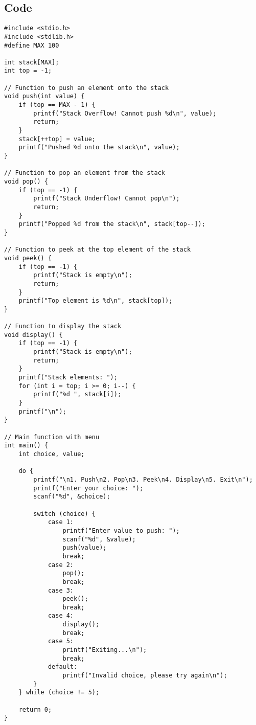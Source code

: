 \documentclass[12pt,a4paper]{article}
\begin{document}
\subsection*{Code}
\begin{lstlisting}
#include <stdio.h>
#include <stdlib.h>
#define MAX 100

int stack[MAX];
int top = -1;

// Function to push an element onto the stack
void push(int value) {
    if (top == MAX - 1) {
        printf("Stack Overflow! Cannot push %d\n", value);
        return;
    }
    stack[++top] = value;
    printf("Pushed %d onto the stack\n", value);
}

// Function to pop an element from the stack
void pop() {
    if (top == -1) {
        printf("Stack Underflow! Cannot pop\n");
        return;
    }
    printf("Popped %d from the stack\n", stack[top--]);
}

// Function to peek at the top element of the stack
void peek() {
    if (top == -1) {
        printf("Stack is empty\n");
        return;
    }
    printf("Top element is %d\n", stack[top]);
}

// Function to display the stack
void display() {
    if (top == -1) {
        printf("Stack is empty\n");
        return;
    }
    printf("Stack elements: ");
    for (int i = top; i >= 0; i--) {
        printf("%d ", stack[i]);
    }
    printf("\n");
}

// Main function with menu
int main() {
    int choice, value;

    do {
        printf("\n1. Push\n2. Pop\n3. Peek\n4. Display\n5. Exit\n");
        printf("Enter your choice: ");
        scanf("%d", &choice);

        switch (choice) {
            case 1:
                printf("Enter value to push: ");
                scanf("%d", &value);
                push(value);
                break;
            case 2:
                pop();
                break;
            case 3:
                peek();
                break;
            case 4:
                display();
                break;
            case 5:
                printf("Exiting...\n");
                break;
            default:
                printf("Invalid choice, please try again\n");
        }
    } while (choice != 5);

    return 0;
}
\end{lstlisting}
\end{document}
